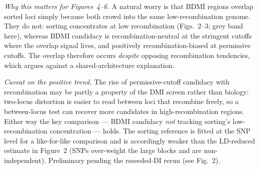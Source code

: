 \documentclass[11pt]{article}
\begin{document}
{%
\emph{Why this matters for Figures~4--6.} A natural worry is that BDMI regions overlap sorted loci
simply because both crowd into the same low-recombination genome. They do not: sorting concentrates
at low recombination (Figs.~2--3; grey band here), whereas BDMI candidacy is recombination-neutral
at the stringent cutoffs where the overlap signal lives, and positively recombination-biased at
permissive cutoffs. The overlap therefore occurs \emph{despite} opposing recombination tendencies,
which argues against a shared-architecture explanation.

\emph{Caveat on the positive trend.} The rise of permissive-cutoff candidacy with recombination may
be partly a property of the DMI screen rather than biology: two-locus distortion is easier to read
between loci that recombine freely, so a between-locus test can recover more candidates in
high-recombination regions. Either way the key comparison --- BDMI candidacy \emph{not} tracking
sorting's low-recombination concentration --- holds. The sorting reference is fitted at the SNP
level for a like-for-like comparison and is accordingly weaker than the LD-reduced estimate in
Figure~2 (SNPs over-weight the large blocks and are non-independent). Preliminary pending the
reseeded-DI rerun (see Fig.~2).}
\end{document}
